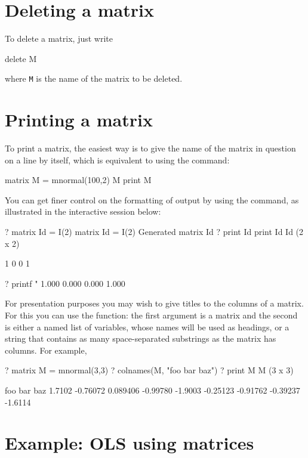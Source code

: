 \section{Deleting a matrix}
\label{matrix-delete}

To delete a matrix, just write
%
\begin{code}
delete M
\end{code}
%
where \texttt{M} is the name of the matrix to be deleted.

\section{Printing a matrix}

To print a matrix, the easiest way is to give the name of the matrix
in question on a line by itself, which is equivalent to using the
 command:
%
\begin{code}
matrix M = mnormal(100,2)
M
print M
\end{code}

You can get finer control on the formatting of output by using the
 command, as illustrated in the interactive session below:
%
\begin{code}
? matrix Id = I(2)
 matrix Id = I(2)
Generated matrix Id
? print Id
 print Id
Id (2 x 2)

  1   0 
  0   1 

? printf "%
     1.000     0.000
     0.000     1.000
\end{code}

For presentation purposes you may wish to give titles to the columns
of a matrix.  For this you can use the  function: the first
argument is a matrix and the second is either a named list of variables,
whose names will be used as headings, or a string that contains as many
space-separated substrings as the matrix has columns.  For example,
%
\begin{code}
? matrix M = mnormal(3,3)
? colnames(M, "foo bar baz")
? print M
M (3 x 3)

         foo          bar          baz 
      1.7102     -0.76072     0.089406 
    -0.99780      -1.9003     -0.25123 
    -0.91762     -0.39237      -1.6114
\end{code}


\section{Example: OLS using matrices}
\label{matrix-example}

